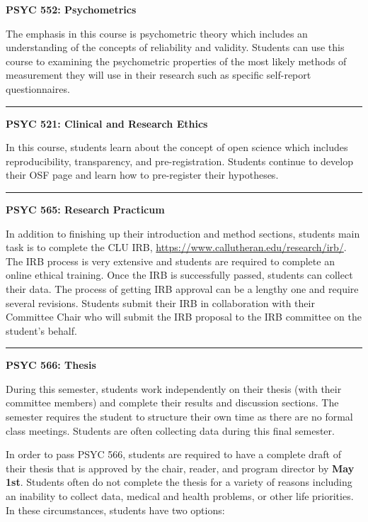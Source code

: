 \documentclass[openany]{book}
\begin{document}
\textbf{PSYC 552: Psychometrics}

The emphasis in this course is psychometric theory which includes an understanding of the concepts of reliability and validity. Students can use this course to examining the psychometric properties of the most likely methods of measurement they will use in their research such as specific self-report questionnaires.

\begin{center}\rule{0.5\linewidth}{0.5pt}\end{center}

\textbf{PSYC 521: Clinical and Research Ethics}

In this course, students learn about the concept of open science which includes reproducibility, transparency, and pre-registration. Students continue to develop their OSF page and learn how to pre-register their hypotheses.

\begin{center}\rule{0.5\linewidth}{0.5pt}\end{center}

\textbf{PSYC 565: Research Practicum}

In addition to finishing up their introduction and method sections, students main task is to complete the CLU IRB, \url{https://www.callutheran.edu/research/irb/}. The IRB process is very extensive and students are required to complete an online ethical training. Once the IRB is successfully passed, students can collect their data. The process of getting IRB approval can be a lengthy one and require several revisions. Students submit their IRB in collaboration with their Committee Chair who will submit the IRB proposal to the IRB committee on the student's behalf.

\begin{center}\rule{0.5\linewidth}{0.5pt}\end{center}

\textbf{PSYC 566: Thesis}

During this semester, students work independently on their thesis (with their committee members) and complete their results and discussion sections. The semester requires the student to structure their own time as there are no formal class meetings. Students are often collecting data during this final semester.

In order to pass PSYC 566, students are required to have a complete draft of their thesis that is approved by the chair, reader, and program director by \textbf{May 1st}. Students often do not complete the thesis for a variety of reasons including an inability to collect data, medical and health problems, or other life priorities. In these circumstances, students have two options:
\end{document}
